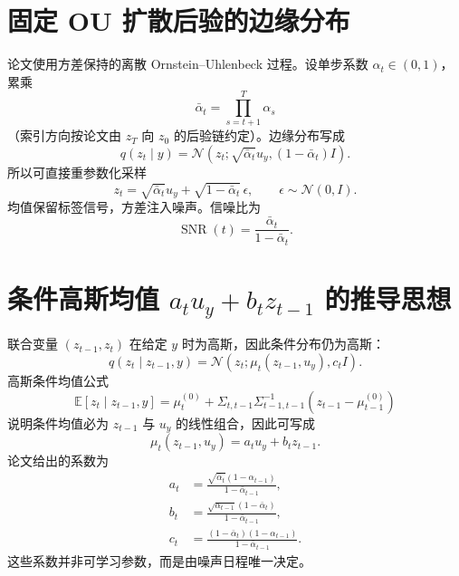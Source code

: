 \documentclass[UTF8,12pt,a4paper,fontset=none]{ctexart}
\numberwithin{equation}{section}
\newcommand{\E}{\mathbb{E}}
\begin{document}
\section{固定 OU 扩散后验的边缘分布}
论文使用方差保持的离散 Ornstein--Uhlenbeck 过程。设单步系数 $\alpha_t\in(0,1)$，累乘
\begin{equation}
 \bar\alpha_t=\prod_{s=t+1}^{T}\alpha_s
\end{equation}
（索引方向按论文由 $z_T$ 向 $z_0$ 的后验链约定）。边缘分布写成
\begin{equation}
 \boxed{q(z_t\mid y)=\mathcal N\!\left(z_t;\sqrt{\bar\alpha_t}u_y,(1-\bar\alpha_t)I\right).}
\end{equation}
所以可直接重参数化采样
\begin{equation}
 z_t=\sqrt{\bar\alpha_t}u_y+\sqrt{1-\bar\alpha_t}\,\epsilon,
 \qquad \epsilon\sim\mathcal N(0,I).
\end{equation}
均值保留标签信号，方差注入噪声。信噪比为
\begin{equation}
 \operatorname{SNR}(t)=\frac{\bar\alpha_t}{1-\bar\alpha_t}.
\end{equation}

\section{条件高斯均值 $a_tu_y+b_tz_{t-1}$ 的推导思想}
联合变量 $(z_{t-1},z_t)$ 在给定 $y$ 时为高斯，因此条件分布仍为高斯：
\begin{equation}
 q(z_t\mid z_{t-1},y)=\mathcal N\!\left(z_t;\mu_t(z_{t-1},u_y),c_tI\right).
\end{equation}
高斯条件均值公式
\begin{equation}
 \E[z_t\mid z_{t-1},y]
 =\mu_t^{(0)}+\Sigma_{t,t-1}\Sigma_{t-1,t-1}^{-1}(z_{t-1}-\mu_{t-1}^{(0)})
\end{equation}
说明条件均值必为 $z_{t-1}$ 与 $u_y$ 的线性组合，因此可写成
\begin{equation}
 \mu_t(z_{t-1},u_y)=a_tu_y+b_tz_{t-1}.
\end{equation}
论文给出的系数为
\begin{align}
 a_t&=\frac{\sqrt{\bar\alpha_t}(1-\alpha_{t-1})}{1-\bar\alpha_{t-1}},\\
 b_t&=\frac{\sqrt{\alpha_{t-1}}(1-\bar\alpha_t)}{1-\bar\alpha_{t-1}},\\
 c_t&=\frac{(1-\bar\alpha_t)(1-\alpha_{t-1})}{1-\bar\alpha_{t-1}}.
\end{align}
这些系数并非可学习参数，而是由噪声日程唯一决定。
\end{document}

